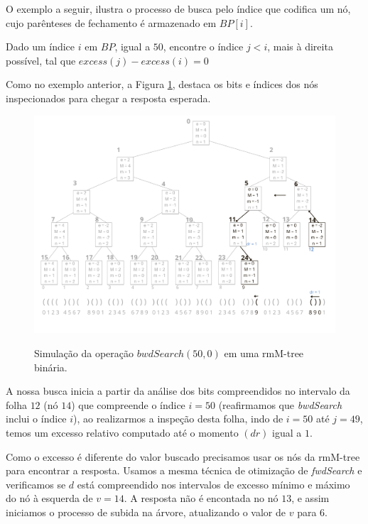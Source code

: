     O exemplo a seguir, ilustra o processo de busca pelo índice que codifica um nó, cujo parênteses de fechamento é armazenado em $BP[i]$.
    \begin{example}\label{ex:bin-bwd}
        Dado um índice $i$ em $BP$, igual a $50$, encontre o índice $j<i$, mais à direita possível, tal que $excess(j) - excess(i) = 0$


        Como no exemplo anterior, a Figura \ref{fig:bin-bwdSearch}, destaca os bits e índices dos nós inspecionados para chegar a resposta esperada.
        \begin{figure}[h!]
           \centering
             \caption[bwdSearch(50,0).]{Simulação da operação $bwdSearch(50,0)$ em uma rmM-tree binária.}
             \includegraphics[width=\columnwidth]{images/rmm-tree-bin-bwdsearch.png}
             \label{fig:bin-bwdSearch}
        \end{figure}

        A nossa busca inicia a partir da análise dos bits compreendidos no intervalo da folha $12$ (nó $14$) que compreende o índice $i=50$ (reafirmamos que \textit{bwdSearch} inclui o índice $i$), ao realizarmos a inspeção desta folha, indo de $i=50$ até $j=49$, temos um excesso relativo computado até o momento $(dr)$ igual a $1$. 
        
        Como o excesso é diferente do valor buscado precisamos usar os nós da rmM-tree para encontrar a resposta. Usamos a mesma técnica de otimização de \textit{fwdSearch} e verificamos se $d$ está compreendido nos intervalos de excesso mínimo e máximo do nó à esquerda de $v=14$. A resposta não é encontada no nó $13$, e assim iniciamos o processo de subida na árvore, atualizando o valor de $v$ para $6$.
        

\end{example}
